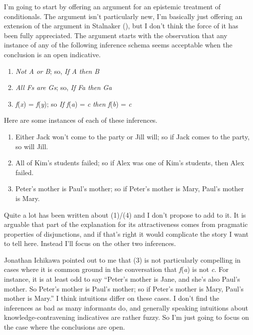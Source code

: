 \documentclass[
  11pt,
  letterpaper,
  DIV=11,
  numbers=noendperiod,
  oneside]{scrartcl}
\providecommand{\tightlist}{%
  \setlength{\itemsep}{0pt}\setlength{\parskip}{0pt}}\usepackage{longtable,booktabs,array}
\begin{document}
I'm going to start by offering an argument for an epistemic treatment of
conditionals. The argument isn't particularly new, I'm basically just
offering an extension of the argument in Stalnaker
(), but I don't think the force
of it has been fully appreciated. The argument starts with the
observation that any instance of any of the following inference schema
seems acceptable when the conclusion is an open indicative.

\begin{enumerate}
\def\labelenumi{\arabic{enumi}.}
\tightlist
\item
  \emph{Not A or B}; so, \emph{If A then B}
\item
  \emph{All Fs are Gs}; so, \emph{If Fa then Ga}
\item
  \emph{f}(\emph{x}) = \emph{f}(\emph{y}); so \emph{If f}(\emph{a}) =
  \emph{c} \emph{then f}(\emph{b}) = \emph{c}
\end{enumerate}

Here are some instances of each of these inferences.

\begin{enumerate}
\def\labelenumi{\arabic{enumi}.}
\setcounter{enumi}{3}
\tightlist
\item
  Either Jack won't come to the party or Jill will; so if Jack comes to
  the party, so will Jill.
\item
  All of Kim's students failed; so if Alex was one of Kim's students,
  then Alex failed.
\item
  Peter's mother is Paul's mother; so if Peter's mother is Mary, Paul's
  mother is Mary.
\end{enumerate}

Quite a lot has been written about (1)/(4) and I don't propose to add to
it. It is arguable that part of the explanation for its attractiveness
comes from pragmatic properties of disjunctions, and if that's right it
would complicate the story I want to tell here. Instead I'll focus on
the other two inferences.

Jonathan Ichikawa pointed out to me that (3) is not particularly
compelling in cases where it is common ground in the conversation that
\emph{f}(\emph{a}) is not \emph{c}. For instance, it is at least odd to
say ``Peter's mother is Jane, and she's also Paul's mother. So Peter's
mother is Paul's mother; so if Peter's mother is Mary, Paul's mother is
Mary.'' I think intuitions differ on these cases. I don't find the
inferences as bad as many informants do, and generally speaking
intuitions about knowledge-contravening indicatives are rather fuzzy. So
I'm just going to focus on the case where the conclusions are open.
\end{document}
